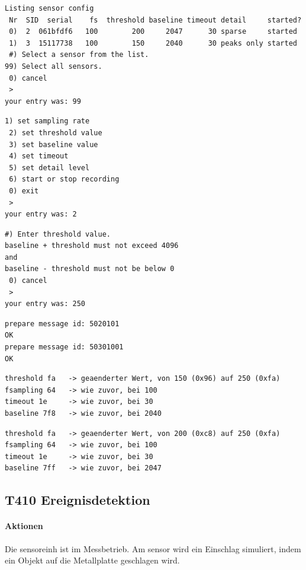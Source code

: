 \begin{lstlisting}[caption=T400 Vorbedingung und Auswahl aller Sensoren, label=t400.1]
Listing sensor config
 Nr  SID  serial    fs  threshold baseline timeout detail     started?
 0)  2  061bfdf6   100        200     2047      30 sparse     started
 1)  3  15117738   100        150     2040      30 peaks only started
 #) Select a sensor from the list.
99) Select all sensors.
 0) cancel
 >
your entry was: 99
\end{lstlisting}

\begin{lstlisting}[caption=T400 Auswahl des Parameters, label=t400.2]
 1) set sampling rate
 2) set threshold value
 3) set baseline value
 4) set timeout
 5) set detail level
 6) start or stop recording
 0) exit
 >
your entry was: 2
\end{lstlisting}

\begin{lstlisting}[caption=T400 Eingabe des neuen \gls{threshold}s, label=t400.3]
 #) Enter threshold value.
baseline + threshold must not exceed 4096
and
baseline - threshold must not be below 0
 0) cancel
 >
your entry was: 250
\end{lstlisting}

\begin{lstlisting}[caption=T400 Sendeprotokoll am \gls{logger}, label=t400.4]
prepare message id: 5020101
OK
prepare message id: 50301001
OK
\end{lstlisting}

\begin{lstlisting}[caption=T400 Konfiguration aus Sensor 3, label=t400.5]
threshold fa   -> geaenderter Wert, von 150 (0x96) auf 250 (0xfa)
fsampling 64   -> wie zuvor, bei 100
timeout 1e     -> wie zuvor, bei 30
baseline 7f8   -> wie zuvor, bei 2040
\end{lstlisting}

\begin{lstlisting}[caption=T400 Konfiguration aus Sensor 2, label=t400.6]
threshold fa   -> geaenderter Wert, von 200 (0xc8) auf 250 (0xfa)
fsampling 64   -> wie zuvor, bei 100
timeout 1e     -> wie zuvor, bei 30
baseline 7ff   -> wie zuvor, bei 2047
\end{lstlisting}


\subsection{T410 Ereignisdetektion}
\paragraph{Aktionen} Die \gls{sensoreinh} ist im Messbetrieb. Am \gls{sensor} wird ein Einschlag simuliert, indem ein Objekt auf die Metallplatte geschlagen wird. 

